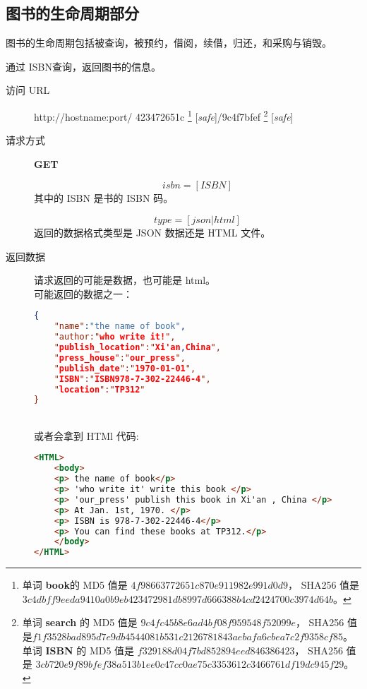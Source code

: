 \documentclass[UTF8]{ctexart}
\def\safe{[\textit{safe}]}
\def\GET{\textbf{GET}}
\begin{document}
        
        
        
        
        \subsection{图书的生命周期部分}
        图书的生命周期包括被查询，被预约，借阅，续借，归还，和采购与销毁。
        
        
        
        
        
        
        通过 ISBN查询，返回图书的信息。
        \begin{description}
        	
        	\item[访问 URL] http://hostname:port/
        	423472651c
        	\footnote{单词 \textbf{book}的
        		MD5 值是 $4f98663772651c870e911982e991d0d9$，
        		SHA256 值是 $3c4dbff9eeda9410a0b9eb423472981db8997d666388b4cd2424700c3974d64b$。
        		}
	        \safe/9c4f7bfef
	        \footnote{
	        	单词 \textbf{search} 的
	        	MD5 值是 $9c4fc45b8e6ad4bf08f959548f52099e$，
	        	SHA256 值是$f1f3528bad895d7e9db4544081b531c2126781843aebafa6cbea7c2f9358cf85$。
	        	单词 \textbf{ISBN} 的
	        	MD5 值是 $f329188d04f7bd852894eed846386423$，
	        	SHA256 值是 $3cb720e9f89bfef38a513b1ee0c47cc0ae75c3353612c3466761df19dc945f29$。
	        	}
	        \safe
	        
	        
	        \item[请求方式] \GET
	        
	        
	        $$isbn=[ISBN]$$
	        其中的 ISBN 是书的 ISBN 码。
	        
	        
	        $$type=[json|html]$$
	        返回的数据格式类型是 JSON 数据还是 HTML 文件。
	        
	        \item[返回数据] 请求返回的可能是数据，也可能是 html。
	        \\ 可能返回的数据之一：
	        \begin{lstlisting}[language=JSON]
{
	"name":"the name of book",
	"author:"who write it!",
	"publish_location":"Xi'an,China",
	"press_house":"our_press",
	"publish_date":"1970-01-01",
	"ISBN":"ISBN978-7-302-22446-4",
	"location":"TP312"
}
	        \end{lstlisting}
	        \\ 或者会拿到 HTMl 代码:
	        \begin{lstlisting}[language=HTML]
<HTML>
	<body>
	<p> the name of book</p>
	<p> 'who write it' write this book </p>
	<p> 'our_press' publish this book in Xi'an , China </p>
	<p> At Jan. 1st, 1970. </p>
	<p> ISBN is 978-7-302-22446-4</p>
	<p> You can find these books at TP312.</p>
	</body>
</HTML>
	        \end{lstlisting}
        \end{description}
        
\end{document}
